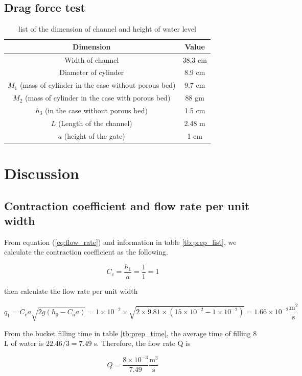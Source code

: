 \documentclass[a4paper]{report}
\begin{document}
\subsection{Drag force test}

\begin{table}[H]
    \centering
    \begin{tabular}{|c|c|}\hline
        Dimension & Value \\\hline
        Width of channel & 38.3 cm \\\hline
        Diameter of cylinder & 8.9 cm \\\hline
        $M_1$ (mass of cylinder in the case without porous bed) & 9.7 cm \\\hline
        $M_2$ (mass of cylinder in the case with porous bed) & 88 gm \\\hline
        $h_3$  (in the case without porous bed) & 1.5 cm \\\hline
        $L$ (Length of the channel) & 2.48 m \\\hline
        $a$ (height of the gate) & 1 cm \\\hline
    \end{tabular}
    \caption{list of the dimension of channel and height of water level}
    \label{tb:drag}
\end{table}

\section{Discussion}

\subsection{Contraction coefficient and flow rate per unit width}
From equation (\ref{eq:flow_rate}) and information in table \ref{tb:prep_list}, we calculate the contraction coefficient as the following.

\[C_c=\frac{h_1}{a}=\frac{1}{1}=1\]

then calculate the flow rate per unit width

\[q_1=C_ca\sqrt{2g(h_0-C_a a)}=1\times10^{-2}\times\sqrt{2\times9.81\times(15\times10^{-2}-1\times10^{-2})}=1.66\times10^{-2}\frac{\text{m}^2}{\text{s}}\]

From the bucket filling time in table \ref{tb:prep_time}, the average time of filling 8 L of water is $22.46/3=7.49$ s. Therefore, the flow rate Q is

\[Q=\frac{8\times10^{-3}}{7.49}\frac{\text{m}^3}{\text{s}}\]
\end{document}

